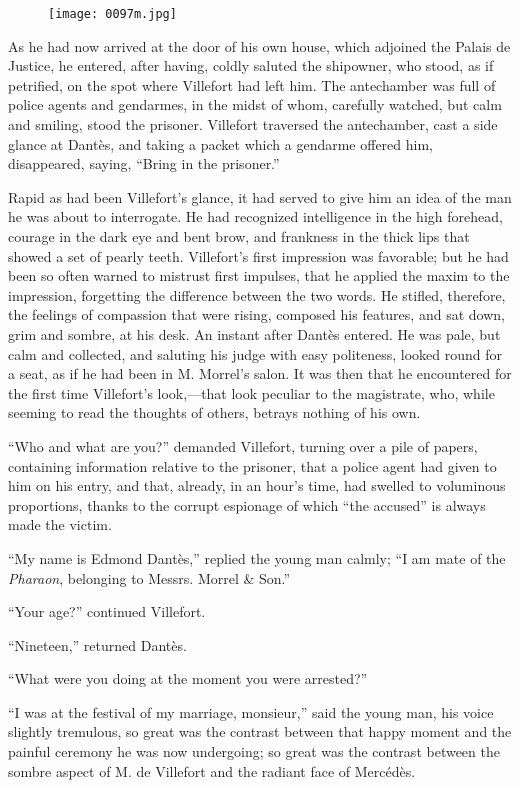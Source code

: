\begin{figure}[ht]
\texttt{[image: 0097m.jpg]}
\end{figure}

As he had now arrived at the door of his own house, which adjoined the
Palais de Justice, he entered, after having, coldly saluted the
shipowner, who stood, as if petrified, on the spot where Villefort had
left him. The antechamber was full of police agents and gendarmes, in
the midst of whom, carefully watched, but calm and smiling, stood the
prisoner. Villefort traversed the antechamber, cast a side glance at
Dantès, and taking a packet which a gendarme offered him, disappeared,
saying, “Bring in the prisoner.”

Rapid as had been Villefort’s glance, it had served to give him an idea
of the man he was about to interrogate. He had recognized intelligence
in the high forehead, courage in the dark eye and bent brow, and
frankness in the thick lips that showed a set of pearly teeth.
Villefort’s first impression was favorable; but he had been so often
warned to mistrust first impulses, that he applied the maxim to the
impression, forgetting the difference between the two words. He
stifled, therefore, the feelings of compassion that were rising,
composed his features, and sat down, grim and sombre, at his desk. An
instant after Dantès entered. He was pale, but calm and collected, and
saluting his judge with easy politeness, looked round for a seat, as if
he had been in M. Morrel’s salon. It was then that he encountered for
the first time Villefort’s look,—that look peculiar to the magistrate,
who, while seeming to read the thoughts of others, betrays nothing of
his own.

“Who and what are you?” demanded Villefort, turning over a pile of
papers, containing information relative to the prisoner, that a police
agent had given to him on his entry, and that, already, in an hour’s
time, had swelled to voluminous proportions, thanks to the corrupt
espionage of which “the accused” is always made the victim.

“My name is Edmond Dantès,” replied the young man calmly; “I am mate of
the \textit{Pharaon}, belonging to Messrs. Morrel \& Son.”

“Your age?” continued Villefort.

“Nineteen,” returned Dantès.

“What were you doing at the moment you were arrested?”

“I was at the festival of my marriage, monsieur,” said the young man,
his voice slightly tremulous, so great was the contrast between that
happy moment and the painful ceremony he was now undergoing; so great
was the contrast between the sombre aspect of M. de Villefort and the
radiant face of Mercédès.

